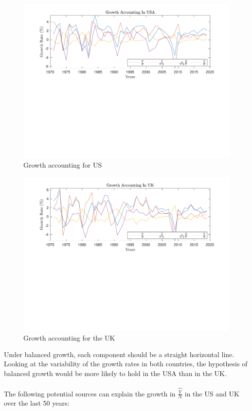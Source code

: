 \documentclass[12pt]{article}
\theoremstyle{mytheoremstyle}
\theoremstyle{mytheoremstyle}
\theoremstyle{myproblemstyle}
\begin{document}
\begin{figure}[htbp]
    \includegraphics[trim = 0in 3.2in 0in 0in, clip, width=1\textwidth]{out/Growth_Accounting_us.pdf}
    \caption{Growth accounting for US}
\end{figure}

\begin{figure}[htbp]
    \includegraphics[trim = 0in 3.2in 0in 0in, clip, width=1\textwidth]{out/Growth_Accounting_uk.pdf}
    \caption{Growth accounting for the UK}
\end{figure}

Under balanced growth, each component should be a straight horizontal line. Looking at the variability of the growth rates in both countries, the hypothesis of balanced growth would
be more likely to hold in the USA than in the UK.
\\ \\ 
The following potential sources can explain the growth in $\widehat{\frac{Y}{N}}$ in the US and UK over the last 50 years:
\end{document}

